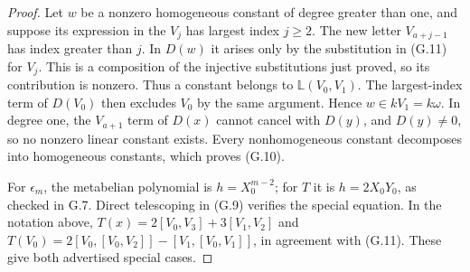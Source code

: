 \begin{proof}
Let $w$ be a nonzero homogeneous constant of degree greater than
one, and suppose its expression in the $V_j$ has largest index
$j\ge2$. The new letter $V_{a+j-1}$ has index greater than $j$.
In $D(w)$ it arises only by the substitution in (G.11) for $V_j$.
This is a composition of the injective substitutions just proved,
so its contribution is nonzero. Thus a constant belongs to
$\mathbb L(V_0,V_1)$. The largest-index term of $D(V_0)$ then
excludes $V_0$ by the same argument. Hence $w\in kV_1=k\omega$.
In degree one, the $V_{a+1}$ term of $D(x)$ cannot cancel with
$D(y)$, and $D(y)\ne0$, so no nonzero linear constant exists.
Every nonhomogeneous constant decomposes into homogeneous constants,
which proves (G.10).

For $\epsilon_m$, the metabelian polynomial is $h=X_0^{m-2}$;
for $T$ it is $h=2X_0Y_0$, as checked in G.7. Direct telescoping
in (G.9) verifies the special equation. In the notation above,
$T(x)=2[V_0,V_3]+3[V_1,V_2]$ and
$T(V_0)=2[V_0,[V_0,V_2]]-[V_1,[V_0,V_1]]$, in agreement with
(G.11). These give both advertised special cases.
\end{proof}


